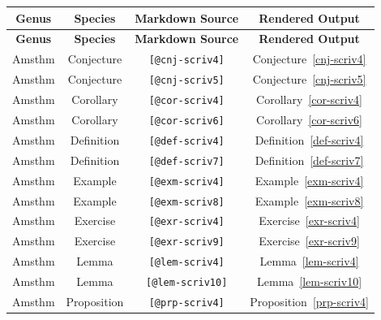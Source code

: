 \documentclass[
  12pt,
  a4paper,
  oneside,
  numbers=noenddot,
  titlepage,
  toclink=all,
  toc=bibliography]{scrbook}
\theoremstyle{definition}
\theoremstyle{definition}
\theoremstyle{definition}
\theoremstyle{plain}
\theoremstyle{plain}
\theoremstyle{plain}
\theoremstyle{plain}
\theoremstyle{plain}
\theoremstyle{remark}
\begin{document}
\hypertarget{tbl-scriv3}{}
\begin{longtable}[]{@{}cccc@{}}
\toprule\noalign{}
\textbf{Genus} & \textbf{Species} & \textbf{Markdown Source} &
\textbf{Rendered Output} \\
\midrule\noalign{}
\endfirsthead
\toprule\noalign{}
\textbf{Genus} & \textbf{Species} & \textbf{Markdown Source} &
\textbf{Rendered Output} \\
\midrule\noalign{}
\endhead
\bottomrule\noalign{}
\endlastfoot
Amsthm & Conjecture & \texttt{{[}@cnj-scriv4{]}} &
\protect\hypertarget{cite_9}{}{\label{cite_9}Conjecture~\ref{cnj-scriv4}} \\
Amsthm & Conjecture & \texttt{{[}@cnj-scriv5{]}} &
\protect\hypertarget{cite_10}{}{\label{cite_10}Conjecture~\ref{cnj-scriv5}} \\
Amsthm & Corollary & \texttt{{[}@cor-scriv4{]}} &
\protect\hypertarget{cite_11}{}{\label{cite_11}Corollary~\ref{cor-scriv4}} \\
Amsthm & Corollary & \texttt{{[}@cor-scriv6{]}} &
\protect\hypertarget{cite_12}{}{\label{cite_12}Corollary~\ref{cor-scriv6}} \\
Amsthm & Definition & \texttt{{[}@def-scriv4{]}} &
\protect\hypertarget{cite_13}{}{\label{cite_13}Definition~\ref{def-scriv4}} \\
Amsthm & Definition & \texttt{{[}@def-scriv7{]}} &
\protect\hypertarget{cite_14}{}{\label{cite_14}Definition~\ref{def-scriv7}} \\
Amsthm & Example & \texttt{{[}@exm-scriv4{]}} &
\protect\hypertarget{cite_15}{}{\label{cite_15}Example~\ref{exm-scriv4}} \\
Amsthm & Example & \texttt{{[}@exm-scriv8{]}} &
\protect\hypertarget{cite_16}{}{\label{cite_16}Example~\ref{exm-scriv8}} \\
Amsthm & Exercise & \texttt{{[}@exr-scriv4{]}} &
\protect\hypertarget{cite_17}{}{\label{cite_17}Exercise~\ref{exr-scriv4}} \\
Amsthm & Exercise & \texttt{{[}@exr-scriv9{]}} &
\protect\hypertarget{cite_18}{}{\label{cite_18}Exercise~\ref{exr-scriv9}} \\
Amsthm & Lemma & \texttt{{[}@lem-scriv4{]}} &
\protect\hypertarget{cite_19}{}{\label{cite_19}Lemma~\ref{lem-scriv4}} \\
Amsthm & Lemma & \texttt{{[}@lem-scriv10{]}} &
\protect\hypertarget{cite_20}{}{\label{cite_20}Lemma~\ref{lem-scriv10}} \\
Amsthm & Proposition & \texttt{{[}@prp-scriv4{]}} &
\protect\hypertarget{cite_21}{}{\label{cite_21}Proposition~\ref{prp-scriv4}} \\

\end{longtable}
\end{document}
